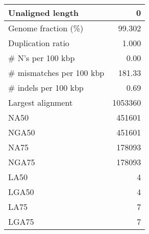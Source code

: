 \documentclass[12pt,a4paper]{article}
\begin{document}
\begin{table}[ht]
\begin{center}
\begin{tabular}{|l*{1}{|r}|}
Unaligned length & 0 \\ \hline
Genome fraction (\%) & 99.302 \\ \hline
Duplication ratio & 1.000 \\ \hline
\# N's per 100 kbp & 0.00 \\ \hline
\# mismatches per 100 kbp & 181.33 \\ \hline
\# indels per 100 kbp & 0.69 \\ \hline
Largest alignment & 1053360 \\ \hline
NA50 & 451601 \\ \hline
NGA50 & 451601 \\ \hline
NA75 & 178093 \\ \hline
NGA75 & 178093 \\ \hline
LA50 & 4 \\ \hline
LGA50 & 4 \\ \hline
LA75 & 7 \\ \hline
LGA75 & 7 \\ \hline
\end{tabular}
\end{center}
\end{table}
\end{document}
